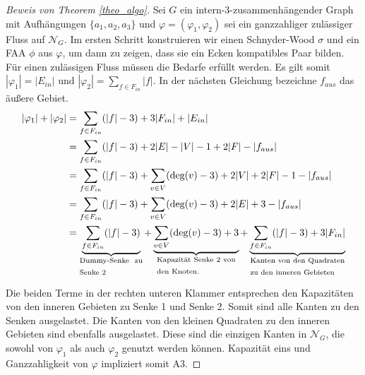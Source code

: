 \begin{proof}[Beweis von Theorem \ref{theo_algo}]
Sei $G$ ein intern-3-zusammenhängender Graph mit Aufhängungen $\{a_1,a_2,a_3\}$ und $\varphi=(\varphi_1,\varphi_2)$ sei ein ganzzahliger zulässiger Fluss auf $\mathcal{N}_G$. Im ersten Schritt konstruieren wir einen Schnyder-Wood $\sigma$ und ein FAA $\phi$ aus $\varphi$, um dann zu zeigen, dass sie ein Ecken kompatibles Paar bilden. Für einen zulässigen Fluss müssen die Bedarfe erfüllt werden. Es gilt somit $|\varphi_1| =  |E_{in}|$ und $|\varphi_2| = \sum_{f \in F_{in}} |f|$. In der nächsten Gleichung bezeichne $f_{aus}$ das äußere Gebiet.
\begin{equation}\label{eq_sat}
\begin{split}
|\varphi_1| + |\varphi_2| & = \sum_{f \in F_{in}} (|f|-3) + 3|F_{in}| + |E_{in}|\\
		& = \sum_{f \in F_{in}} (|f|-3) + 2|E| -|V| - 1 + 2|F| - |f_{aus}|\\
		& = \sum_{f \in F_{in}} (|f|-3) + \sum_{v \in V} (\text{deg}(v)-3) + 2|V| + 2|F| - 1 - |f_{aus}|\\
		& = \sum_{f \in F_{in}} (|f|-3) + \sum_{v \in V} (\text{deg}(v)-3) + 2|E| + 3 - |f_{aus}|\\
		& = \underbrace{\sum_{f \in F_{in}}(|f|-3)  }_{\text{\parbox{8em}{Dummy-Senke zu Senke 2}}} + \underbrace{\sum_{v \in V} (\text{deg}(v)-3) +3 }_{\text{\parbox{10em}{Kapazität Senke 2 von den Knoten.}}} +\underbrace{\sum_{f \in F_{in}}(|f|-3) + 3|F_{in}|}_{\text{\parbox{12em}{Kanten von den Quadraten zu den inneren Gebieten}}}
\end{split}
\end{equation}

Die beiden Terme in der rechten unteren Klammer entsprechen den Kapazitäten von den inneren Gebieten zu Senke 1 und Senke 2. Somit sind alle Kanten zu den Senken ausgelastet. Die Kanten von den kleinen Quadraten zu den inneren Gebieten sind ebenfalls ausgelastet. Diese sind die einzigen Kanten in $\mathcal{N}_G$, die sowohl von $\varphi_1$ als auch $\varphi_2$ genutzt werden können. Kapazität eins und Ganzzahligkeit von $\varphi$ impliziert somit A3.


\end{proof}
